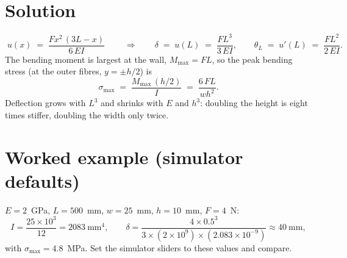 \documentclass[10pt,a4paper]{article}
\begin{document}
\section*{Solution}
\begin{equation}
\boxed{\; u(x) \;=\; \frac{F x^2 \, (3L - x)}{6\,EI} \;}
\qquad\Rightarrow\qquad
\delta \;=\; u(L) \;=\; \frac{F L^3}{3\,EI},
\qquad
\theta_L \;=\; u'(L) \;=\; \frac{F L^2}{2\,EI}.
\end{equation}
The bending moment is largest at the wall, $M_{\max} = FL$, so the peak bending
stress (at the outer fibres, $y = \pm h/2$) is
\begin{equation}
\sigma_{\max} \;=\; \frac{M_{\max}\,(h/2)}{I} \;=\; \frac{6\,F L}{w h^2}.
\end{equation}
Deflection grows with $L^3$ and shrinks with $E$ and $h^3$: doubling the height
is eight times stiffer, doubling the width only twice.

\section*{Worked example (simulator defaults)}
$E = 2$~GPa, $L = 500$~mm, $w = 25$~mm, $h = 10$~mm, $F = 4$~N:
\begin{equation}
I = \frac{25 \times 10^3}{12} = 2083~\text{mm}^4, \qquad
\delta = \frac{4 \times 0.5^3}{3 \times (2\times10^{9}) \times (2.083\times10^{-9})}
\approx 40~\text{mm},
\end{equation}
with $\sigma_{\max} = 4.8$~MPa. Set the simulator sliders to these values and
compare.
\end{document}
